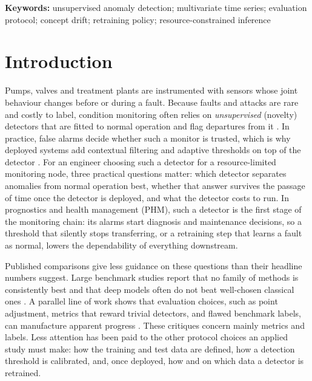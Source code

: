\documentclass[11pt]{article}
\begin{document}
\noindent\textbf{Keywords:} unsupervised anomaly detection; multivariate time
series; evaluation protocol; concept drift; retraining policy; resource-constrained inference

\section{Introduction}

Pumps, valves and treatment plants are instrumented with sensors whose joint
behaviour changes before or during a fault. Because faults and attacks are rare
and costly to label, condition monitoring often relies on \emph{unsupervised}
(novelty) detectors that are fitted to normal operation and flag departures from
it \citep{chandola2009,mukherjee2021}. In practice, false alarms decide whether such a
monitor is trusted, which is why deployed systems add contextual filtering and
adaptive thresholds on top of the detector \citep{lee2017}. For an engineer choosing such a detector for a
resource-limited monitoring node, three practical questions matter: which
detector separates anomalies from normal operation best, whether that answer
survives the passage of time once the detector is deployed, and what the
detector costs to run. In prognostics and health management (PHM), such a detector is
the first stage of the monitoring chain: its alarms start diagnosis and maintenance
decisions, so a threshold that silently stops transferring, or a retraining step that
learns a fault as normal, lowers the dependability of everything downstream.

Published comparisons give less guidance on these questions than their
headline numbers suggest. Large benchmark studies report that no family of
methods is consistently best and that deep models often do not beat
well-chosen classical ones \citep{audibert2022,schmidl2022,sarfraz2024}. A
parallel line of work shows that evaluation choices, such as point adjustment,
metrics that reward trivial detectors, and flawed benchmark labels, can
manufacture apparent progress \citep{kim2022,garg2021,wu2023,liu2024}. These
critiques concern mainly metrics and labels. Less attention has been paid to
the other protocol choices an applied study must make: how the training and
test data are defined, how a detection threshold is calibrated, and, once
deployed, how and on which data a detector is retrained.
\end{document}
